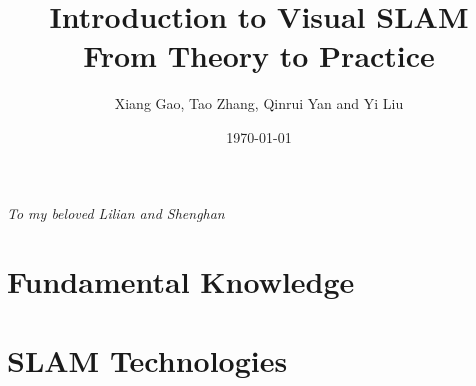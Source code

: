 \documentclass[a4paper,9pt,openleft]{book}
\begin{document}
\title{Introduction to Visual SLAM\\From Theory to Practice}
\author{Xiang Gao, Tao Zhang, Qinrui Yan and Yi Liu}
\date{\today}

\frontmatter
\maketitle


\clearpage
\begin{center}
	\thispagestyle{empty}
	\vspace*{\fill}
	\Large \emph{To my beloved Lilian and Shenghan}
	\vspace*{\fill}
\end{center}



%


\tableofcontents



\mainmatter 
{}
\hypersetup{bookmarksdepth=2}

\part{Fundamental  Knowledge}






\part{SLAM Technologies}









\appendix
{}
\hypersetup{bookmarksdepth=2}




\backmatter
\small


\newpage
\end{document}
